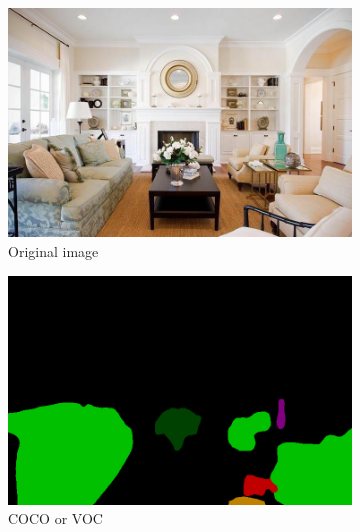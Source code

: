 \documentclass[12pt,a4paper]{report}
\newcommand{\acronym}{\MakeUppercase}
\begin{document}
	\begin{figure}[h!]
		\caption{Results given from indoor input. Fully convolutional network, Pyramid 
		scene parsing network and DeepLab trained on \acronym{coco}, \acronym{pascal voc} 
		and \acronym{ade20k} dataset.}
		\centering
		\begin{subfigure}[b]{0.3\textwidth}
			\includegraphics[width=\textwidth]{in}
			\caption{Original image}
		\end{subfigure}
		\begin{subfigure}[b]{0.3\textwidth}
			\includegraphics[width=\textwidth]{in_coco_voc}
			\caption{\acronym{coco} or \acronym{voc}}
		\end{subfigure}
		\\
		\begin{subfigure}[b]{0.3\textwidth}

\end{subfigure}
\end{figure}
\end{document}
